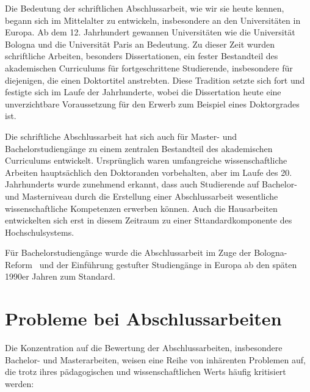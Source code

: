 \documentclass[conference]{IEEEtran}
\begin{document}
Die Bedeutung der schriftlichen Abschlussarbeit, wie wir sie heute kennen, begann sich im Mittelalter zu entwickeln, insbesondere an den Universitäten in Europa. Ab dem 12. Jahrhundert gewannen Universitäten wie die Universität Bologna und die Universität Paris an Bedeutung. Zu dieser Zeit wurden schriftliche Arbeiten, besonders Dissertationen, ein fester Bestandteil des akademischen Curriculums für fortgeschrittene Studierende, insbesondere für diejenigen, die einen Doktortitel anstrebten. Diese Tradition setzte sich fort und festigte sich im Laufe der Jahrhunderte, wobei die Dissertation heute eine unverzichtbare Voraussetzung für den Erwerb zum Beispiel eines Doktorgrades ist.~\cite{hps_medieval_universities}

Die schriftliche Abschlussarbeit hat sich auch für Master- und Bachelorstudiengänge zu einem zentralen Bestandteil des akademischen Curriculums entwickelt. Ursprünglich waren umfangreiche wissenschaftliche Arbeiten hauptsächlich den Doktoranden vorbehalten, aber im Laufe des 20. Jahrhunderts wurde zunehmend erkannt, dass auch Studierende auf Bachelor- und Masterniveau durch die Erstellung einer Abschlussarbeit wesentliche wissenschaftliche Kompetenzen erwerben können. Auch die Hausarbeiten entwickelten sich erst in diesem Zeitraum zu einer Sttandardkomponente des Hochschulsystems.

Für Bachelorstudiengänge wurde die Abschlussarbeit im Zuge der Bologna-Reform~\cite{terry2008bologna} und der Einführung gestufter Studiengänge in Europa ab den späten 1990er Jahren zum Standard.

\section{Probleme bei Abschlussarbeiten}

Die Konzentration auf die Bewertung der Abschlussarbeiten, insbesondere Bachelor- und Masterarbeiten, weisen eine Reihe von inhärenten Problemen auf, die trotz ihres pädagogischen und wissenschaftlichen Werts häufig kritisiert werden:
\end{document}

